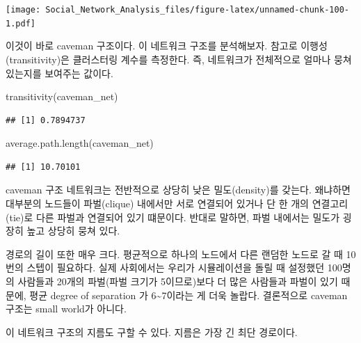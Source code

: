 \documentclass[
]{book}
\newenvironment{Shaded}{\begin{snugshade}}{\end{snugshade}}
\newcommand{\FunctionTok}[1]{\textcolor[rgb]{0.00,0.00,0.00}{#1}}
\newcommand{\NormalTok}[1]{#1}
\begin{document}
\texttt{[image: Social\_Network\_Analysis\_files/figure-latex/unnamed-chunk-100-1.pdf]}

이것이 바로 caveman 구조이다. 이 네트워크 구조를 분석해보자. 참고로 이행성(transitivity)은 클러스터링 계수를 측정한다. 즉, 네트워크가 전체적으로 얼마나 뭉쳐있는지를 보여주는 값이다.

\begin{Shaded}
\begin{Highlighting}[]
\FunctionTok{transitivity}\NormalTok{(caveman\_net) }
\end{Highlighting}
\end{Shaded}

\begin{verbatim}
## [1] 0.7894737
\end{verbatim}

\begin{Shaded}
\begin{Highlighting}[]
\FunctionTok{average.path.length}\NormalTok{(caveman\_net)}
\end{Highlighting}
\end{Shaded}

\begin{verbatim}
## [1] 10.70101
\end{verbatim}

caveman 구조 네트워크는 전반적으로 상당히 낮은 밀도(density)를 갖는다. 왜냐하면 대부분의 노드들이 파벌(clique) 내에서만 서로 연결되어 있거나 단 한 개의 연결고리(tie)로 다른 파벌과 연결되어 있기 떄문이다. 반대로 말하면, 파벌 내에서는 밀도가 굉장히 높고 상당히 뭉쳐 있다.

경로의 길이 또한 매우 크다. 평균적으로 하나의 노드에서 다른 랜덤한 노드로 갈 때 10번의 스텝이 필요하다. 실제 사회에서는 우리가 시뮬레이션을 돌릴 때 설정했던 100명의 사람들과 20개의 파벌(파벌 크기가 5이므로)보다 더 많은 사람들과 파벌이 있기 때문에, 평균 degree of separation 가 6\textasciitilde7이라는 게 더욱 놀랍다. 결론적으로 caveman 구조는 small world가 아니다.

이 네트워크 구조의 지름도 구할 수 있다. 지름은 가장 긴 최단 경로이다.
\end{document}

